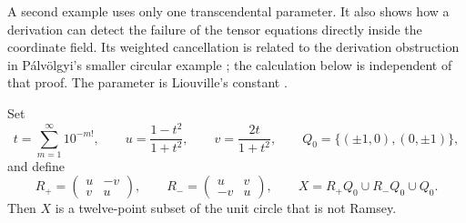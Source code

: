 A second example uses only one transcendental parameter. It also shows
how a derivation can detect the failure of the tensor equations directly
inside the coordinate field. Its weighted cancellation is related to
the derivation obstruction in P\'alv\"olgyi's smaller circular example
\cite[Theorem~1]{palvolgyi-heptagon}; the calculation below is independent
of that proof. The parameter is Liouville's constant
\cite{liouville1851}.

\begin{proposition}\label{cons:twelve}
Set
\[
 t=\sum_{m=1}^{\infty}10^{-m!},\qquad
 u=\frac{1-t^2}{1+t^2},\qquad v=\frac{2t}{1+t^2},
 \qquad Q_0=\{(\pm1,0),(0,\pm1)\},
\]
and define
\[
 R_+=\begin{pmatrix}u&-v\\v&u\end{pmatrix},\qquad
 R_-=\begin{pmatrix}u&v\\-v&u\end{pmatrix},\qquad
 X=R_+Q_0\cup R_-Q_0\cup Q_0.
\]
Then $X$ is a twelve-point subset of the unit circle that is not Ramsey.
\end{proposition}
